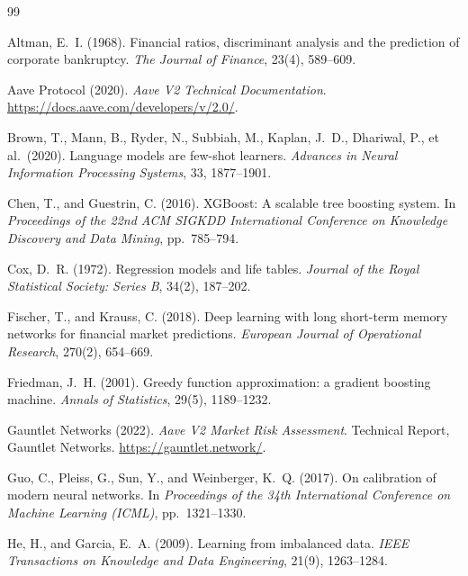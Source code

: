 \documentclass[12pt,a4paper]{article}
\begin{document}
\clearpage


\begin{thebibliography}{99}

Altman, E.~I. (1968).
Financial ratios, discriminant analysis and the prediction of corporate
bankruptcy.
\textit{The Journal of Finance}, 23(4), 589--609.

Aave Protocol (2020).
\textit{Aave V2 Technical Documentation}.
\url{https://docs.aave.com/developers/v/2.0/}.

Brown, T., Mann, B., Ryder, N., Subbiah, M., Kaplan, J.~D., Dhariwal, P.,
et al.\ (2020).
Language models are few-shot learners.
\textit{Advances in Neural Information Processing Systems}, 33, 1877--1901.

Chen, T., and Guestrin, C. (2016).
XGBoost: A scalable tree boosting system.
In \textit{Proceedings of the 22nd ACM SIGKDD International Conference on
Knowledge Discovery and Data Mining}, pp.\ 785--794.

Cox, D.~R. (1972).
Regression models and life tables.
\textit{Journal of the Royal Statistical Society: Series B}, 34(2), 187--202.

Fischer, T., and Krauss, C. (2018).
Deep learning with long short-term memory networks for financial market
predictions.
\textit{European Journal of Operational Research}, 270(2), 654--669.

Friedman, J.~H. (2001).
Greedy function approximation: a gradient boosting machine.
\textit{Annals of Statistics}, 29(5), 1189--1232.

Gauntlet Networks (2022).
\textit{Aave V2 Market Risk Assessment}.
Technical Report, Gauntlet Networks.
\url{https://gauntlet.network/}.

Guo, C., Pleiss, G., Sun, Y., and Weinberger, K.~Q. (2017).
On calibration of modern neural networks.
In \textit{Proceedings of the 34th International Conference on Machine
Learning (ICML)}, pp.\ 1321--1330.

He, H., and Garcia, E.~A. (2009).
Learning from imbalanced data.
\textit{IEEE Transactions on Knowledge and Data Engineering}, 21(9),
1263--1284.


\end{thebibliography}
\end{document}
